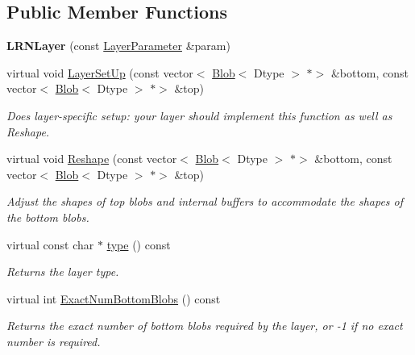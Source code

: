 \subsection*{Public Member Functions}
\begin{DoxyCompactItemize}
\item 
\mbox{\label{classcaffe_1_1_l_r_n_layer_a235b5f1b8fead8d1ddb9c29d627058fe}} 
{\bfseries L\+R\+N\+Layer} (const \mbox{\hyperlink{classcaffe_1_1_layer_parameter}{Layer\+Parameter}} \&param)
\item 
virtual void \mbox{\hyperlink{classcaffe_1_1_l_r_n_layer_ac7ae4b839d952b785b9911c258bd5b48}{Layer\+Set\+Up}} (const vector$<$ \mbox{\hyperlink{classcaffe_1_1_blob}{Blob}}$<$ Dtype $>$ $\ast$$>$ \&bottom, const vector$<$ \mbox{\hyperlink{classcaffe_1_1_blob}{Blob}}$<$ Dtype $>$ $\ast$$>$ \&top)
\begin{DoxyCompactList}\small\item\em Does layer-\/specific setup\+: your layer should implement this function as well as Reshape. \end{DoxyCompactList}\item 
virtual void \mbox{\hyperlink{classcaffe_1_1_l_r_n_layer_aa002dacb2f69d2b500227f938a957a81}{Reshape}} (const vector$<$ \mbox{\hyperlink{classcaffe_1_1_blob}{Blob}}$<$ Dtype $>$ $\ast$$>$ \&bottom, const vector$<$ \mbox{\hyperlink{classcaffe_1_1_blob}{Blob}}$<$ Dtype $>$ $\ast$$>$ \&top)
\begin{DoxyCompactList}\small\item\em Adjust the shapes of top blobs and internal buffers to accommodate the shapes of the bottom blobs. \end{DoxyCompactList}\item 
\mbox{\label{classcaffe_1_1_l_r_n_layer_aaa924f8eed5e6300efdb6bc594a29497}} 
virtual const char $\ast$ \mbox{\hyperlink{classcaffe_1_1_l_r_n_layer_aaa924f8eed5e6300efdb6bc594a29497}{type}} () const
\begin{DoxyCompactList}\small\item\em Returns the layer type. \end{DoxyCompactList}\item 
virtual int \mbox{\hyperlink{classcaffe_1_1_l_r_n_layer_a32be44f9f361d29f05261bd174d92321}{Exact\+Num\+Bottom\+Blobs}} () const
\begin{DoxyCompactList}\small\item\em Returns the exact number of bottom blobs required by the layer, or -\/1 if no exact number is required. \end{DoxyCompactList}\item 

\end{DoxyCompactItemize}
